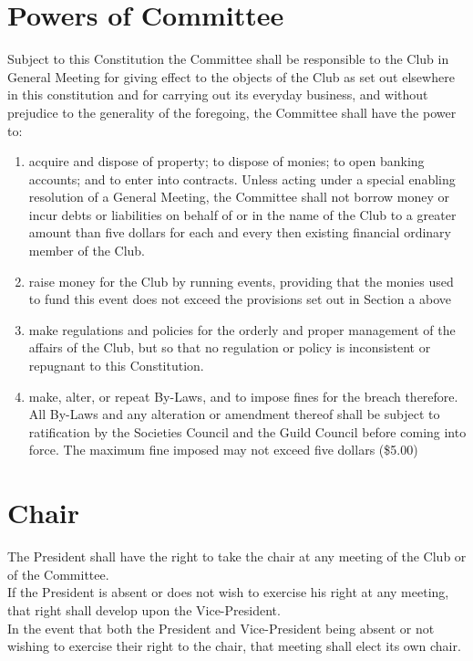 \documentclass[10pt,a4paper]{report}
\begin{document}
	\section{Powers of Committee}
	Subject to this Constitution the Committee shall be responsible to the Club in General Meeting for giving effect to the objects of the Club as set out elsewhere in this constitution and for carrying out its everyday business, and without prejudice to the generality of the foregoing, the Committee shall have the power to:
	\begin{enumerate}[label=\alph*]
		\item acquire and dispose of property; to dispose of monies; to open banking accounts; and to enter into contracts. Unless acting under a special enabling resolution of a General Meeting, the Committee shall not borrow money or incur debts or liabilities on behalf of or in the name of the Club to a greater amount than five dollars for each and every then existing financial ordinary member of the Club.
		\item raise money for the Club by running events, providing that the monies used to fund this event does not exceed the provisions set out in Section a above
		\item make regulations and policies for the orderly and proper management of the affairs of the Club, but so that no regulation or policy is inconsistent or repugnant to this Constitution.
		\item make, alter, or repeat By-Laws, and to impose fines for the breach therefore. All By-Laws and any alteration or amendment thereof shall be subject to ratification by the Societies Council and the Guild Council before coming into force. The maximum fine imposed may not exceed five dollars (\$5.00)
	\end{enumerate}

	\section{Chair}
	The President shall have the right to take the chair at any meeting of the Club or of the Committee. \\
	If the President is absent or does not wish to exercise his right at any meeting, that right shall develop upon the Vice-President. \\
	In the event that both the President and Vice-President being absent or not wishing to exercise their right to the chair, that meeting shall elect its own chair.
\end{document}
